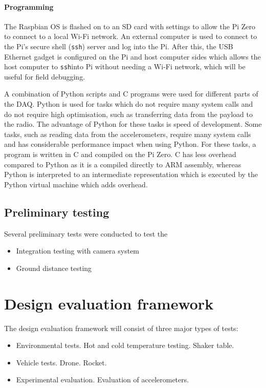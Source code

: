 \documentclass[a4paper,11pt]{article}
\newcommand{\ssh}{\texttt{ssh}}
\begin{document}
\paragraph{Programming}

The Raspbian OS is flashed on to an SD card with settings to allow the Pi Zero to connect to a local Wi-Fi network. An external computer is used to connect to the Pi's secure shell (\ssh) server and log into the Pi. After this, the USB Ethernet gadget is configured on the Pi and host computer sides which allows the host computer to \ssh into Pi without needing a Wi-Fi network, which will be useful for field debugging.

A combination of Python scripts and C programs were used for different parts of the DAQ. Python is used for tasks which do not require many system calls and do not require high optimisation, such as transferring data from the payload to the radio. The advantage of Python for these tasks is speed of development.  Some tasks, such as reading data from the accelerometers, require many system calls and has considerable performance impact when using Python. For these tasks, a program is written in C and compiled on the Pi Zero. C has less overhead compared to Python as it is a compiled directly to ARM assembly, whereas Python is interpreted to an intermediate representation which is executed by the Python virtual machine which adds overhead.

\subsection{Preliminary testing}

Several preliminary tests were conducted to test the

\begin{itemize}
  \item Integration testing with camera system %
  \item Ground distance testing %
\end{itemize}

\section{Design evaluation framework}

The design evaluation framework will consist of three major types of tests:

\begin{itemize}
  \item Environmental tests.
        \subitem Hot and cold temperature testing.
        \subitem Shaker table.
  \item Vehicle tests.
        \subitem Drone.
        \subitem Rocket.
  \item Experimental evaluation.
        \subitem Evaluation of accelerometers.
\end{itemize}
\end{document}
